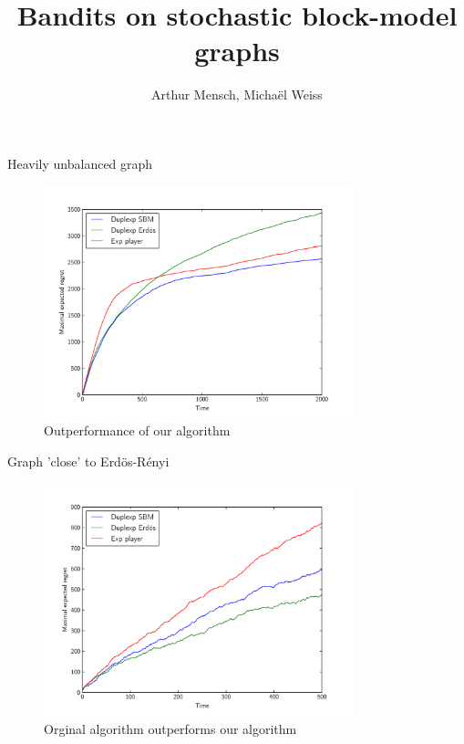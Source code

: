 \documentclass[11pt]{beamer}
\author{Arthur Mensch, Michaël Weiss}
\title{Bandits on stochastic block-model graphs
}
\begin{document}
\begin{frame}
\titlepage
\end{frame}


\begin{frame}{Heavily unbalanced graph}

\begin{figure}[ht]
	\centering
	\includegraphics[width=0.8\textwidth]{hard}
	\caption{Outperformance of our algorithm}
	\label{fig:hard}
\end{figure}

\end{frame}

\begin{frame}{Graph 'close' to Erdös-Rényi}

\begin{figure}[ht]
	\centering
	\includegraphics[width=0.8\textwidth]{easy}
	\caption{Orginal algorithm outperforms our algorithm}
	\label{fig:easy}
\end{figure}
\end{frame}
\end{document}
